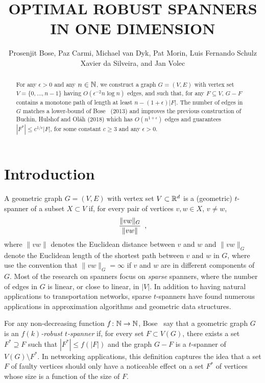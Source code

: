 \documentclass{patmorin}
\title{\MakeUppercase{Optimal Robust Spanners in One Dimension}}
\author{Prosenjit Bose, Paz Carmi, Michael van Dyk, Pat Morin, 
  \newline
  Luis Fernando Schulz Xavier da Silveira,
  and Jan Volec}
\begin{document}
\maketitle


\begin{abstract}
  For any $\epsilon >0$ and any $n\in\mathbb{N}$, we construct a graph $G=(V,E)$
  with vertex set $V=\{0,\ldots,n-1\}$ having $O(\epsilon^{-2}n\log n)$
  edges, and such that, for any $F\subseteq V$, $G-F$ contains a monotone
  path of length at least $n-(1+\epsilon)|F|$.  The number of edges
  in $G$ matches a lower-bound of Bose \etal\ (2013) and improves the
  previous construction of Buchin, Hulshof and Ol\'ah (2018) which has
  $O(n^{1+\epsilon})$ edges and guarantees $|F^*|\le c^{1/\epsilon}|F|$,
  for some constant $c\ge 3$ and any $\epsilon >0$.
\end{abstract}

\section{Introduction}

A geometric graph $G=(V,E)$ with vertex set $V\subset\mathbb{R}^d$ is a (geometric)
$t$-spanner of a subset $X\subset V$ if, for every pair of vertices
$v,w\in X$, $v\neq w$,
\begin{equation}
	\frac{\|vw\|_G}{\|vw\|} \enspace , \eqlabel{spanning-ratio}
\end{equation}
where $\|vw\|$ denotes the Euclidean distance between $v$ and $w$ and
$\|vw\|_G$ denote the Euclidean length of the shortest path between $v$
and $w$ in $G$, where use the convention that $\|vw\|_G=\infty$ if $v$
and $w$ are in different components of $G$.  
Most of the research on spanners focus on \emph{sparse}
spanners, where the number of edges in $G$ is linear, or close to linear,
in $|V|$.  In addition to having natural applications to transportation
networks, sparse $t$-spanners have found numerous applications in
approximation algorithms and geometric data structures.

For any non-decreasing function $f\colon\mathbb{N}\to\mathbb{N}$, Bose \etal\ say that
a geometric graph $G$ is an \emph{$f(k)$-robust $t$-spanner} if, for
every set $F\subset V(G)$, there exists a set $F^*\supseteq F$ such that
$|F^*|\le f(|F|)$ and the graph $G-F$ is a $t$-spanner of $V(G)\setminus
F^*$.  In networking applications, this definition captures the idea
that a set $F$ of faulty vertices should only have a noticeable effect
on a set $F^*$ of vertices whose size is a function of the size of $F$.
\end{document}
